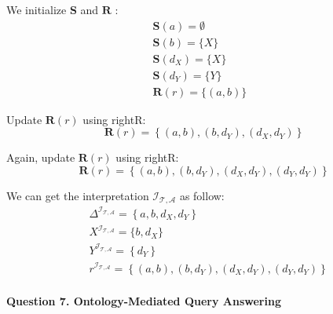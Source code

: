 \documentclass[12pt]{article}
\begin{document}
    We initialize $\boldsymbol{S}$ and $\boldsymbol{R}$ :\\
    $$
    \begin{array}{ll}
    \boldsymbol{S}(a)=\emptyset \\ \boldsymbol{S}(b)=\{X\} \\
    \boldsymbol{S}\left(d_X\right)=\{X\} \\ \boldsymbol{S}\left(d_Y\right)=\{Y\} \\
    \boldsymbol{R}(r)=\{(a, b)\} &
    \end{array}
    $$ \par
    Update $\boldsymbol{R}(r)$ using rightR: 
    $$
    \boldsymbol{R}(r)=\left\{(a, b),\left(b, d_Y\right),\left(d_X, d_Y\right)\right\}
    $$ \par
    Again, update $\boldsymbol{R}(r)$ using rightR:
    $$
    \boldsymbol{R}(r)=\left\{(a, b),\left(b, d_Y\right),\left(d_X, d_Y\right),\left(d_Y, d_Y\right)\right\}
    $$ \par
    We can get the interpretation $\mathcal{I}_{\mathcal{T}, \mathcal{A}}$ as follow:
    $$
    \begin{aligned}
    & \Delta^{\mathcal{I}_{\mathcal{T}, \mathcal{A}}}=\left\{a, b, d_X, d_Y\right\} \\
    & X^{\mathcal{I}_{\mathcal{T}, \mathcal{A}}}=\{b, d_X\} \\
    & Y^{\mathcal{I}_{\mathcal{T}, \mathcal{A}}}=\left\{d_Y\right\} \\
    & r^{\mathcal{I}_{\mathcal{T}, \mathcal{A}}}=\left\{(a, b),\left(b, d_Y\right),\left(d_X, d_Y\right),\left(d_Y, d_Y\right)\right\}
    \end{aligned}
    $$


    \newpage
    \paragraph{Question 7. Ontology-Mediated Query Answering}~{}
    \\
\end{document}
